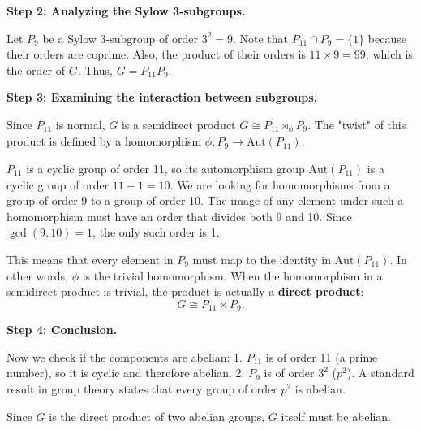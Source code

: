\begin{solution}
\bigskip

\textbf{Step 2: Analyzing the Sylow 3-subgroups.}

Let $P_9$ be a Sylow 3-subgroup of order $3^2 = 9$. Note that $P_{11} \cap P_9 = \{1\}$ because their orders are coprime. Also, the product of their orders is $11 \times 9 = 99$, which is the order of $G$. Thus, $G = P_{11} P_9$.

\bigskip

\textbf{Step 3: Examining the interaction between subgroups.}

Since $P_{11}$ is normal, $G$ is a semidirect product $G \cong P_{11} \rtimes_\phi P_9$. The "twist" of this product is defined by a homomorphism $\phi: P_9 \to \mathrm{Aut}(P_{11})$. 

\bigskip

$P_{11}$ is a cyclic group of order 11, so its automorphism group $\mathrm{Aut}(P_{11})$ is a cyclic group of order $11 - 1 = 10$. We are looking for homomorphisms from a group of order 9 to a group of order 10. The image of any element under such a homomorphism must have an order that divides both 9 and 10. Since $\gcd(9, 10) = 1$, the only such order is 1.

\bigskip

This means that every element in $P_9$ must map to the identity in $\mathrm{Aut}(P_{11})$. In other words, $\phi$ is the trivial homomorphism. When the homomorphism in a semidirect product is trivial, the product is actually a \textbf{direct product}:
\[ G \cong P_{11} \times P_9. \]

\bigskip

\textbf{Step 4: Conclusion.}

Now we check if the components are abelian:
1. $P_{11}$ is of order 11 (a prime number), so it is cyclic and therefore abelian.
2. $P_9$ is of order $3^2$ ($p^2$). A standard result in group theory states that every group of order $p^2$ is abelian.

\bigskip

Since $G$ is the direct product of two abelian groups, $G$ itself must be abelian.
\end{solution}

